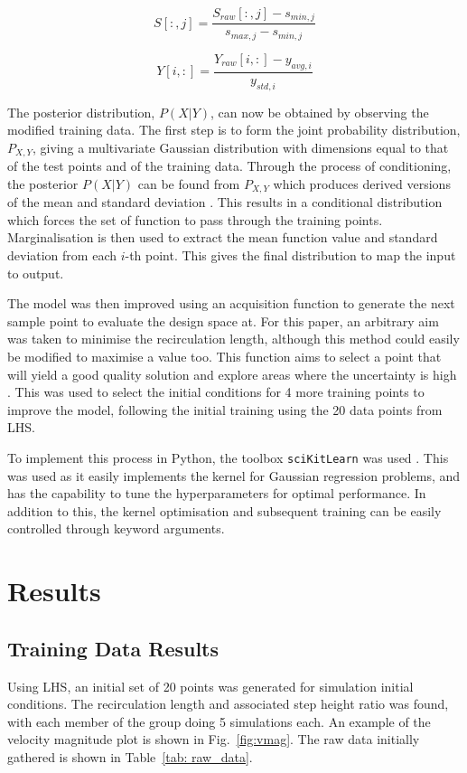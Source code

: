 \documentclass[conference]{IEEEtran}
\begin{document}
\begin{equation}
    S[:,j] = \frac{S_{raw}[:,j]-s_{min,j}}{s_{max,j}-s_{min,j}}
\end{equation}

\begin{equation}
    Y[i,:] = \frac{Y_{raw}[i,:]-y_{avg,i}}{y_{std,i}}
\end{equation}

The posterior distribution, $P(X|Y)$, can now be obtained by observing the modified training data. The first step is to form the joint probability distribution, $P_{X,Y}$, giving a multivariate Gaussian distribution with dimensions equal to that of the test points and of the training data. Through the process of conditioning, the posterior $P(X|Y)$ can be found from $P_{X,Y}$ which produces derived versions of the mean and standard deviation \cite{gortler_visual_2019}. This results in a conditional distribution which forces the set of function to pass through the training points. Marginalisation is then used to extract the mean function value and standard deviation from each $i$-th point. This gives the final distribution to map the input to output.

The model was then improved using an acquisition function to generate the next sample point to evaluate the design space at. For this paper, an arbitrary aim was taken to minimise the recirculation length, although this method could easily be modified to maximise a value too. This function aims to select a point that will yield a good quality solution and explore areas where the uncertainty is high \cite{de_ath_what_2020}. This was used to select the initial conditions for 4 more training points to improve the model, following the initial training using the 20 data points from LHS.

To implement this process in Python, the toolbox \texttt{sciKitLearn} was used \cite{pedregosa_scikit-learn_2011}. This was used as it easily implements the kernel for Gaussian regression problems, and has the capability to tune the hyperparameters for optimal performance. In addition to this, the kernel optimisation and subsequent training can be easily controlled through keyword arguments. 


\section{Results}
\subsection{Training Data Results}
Using LHS, an initial set of 20 points was generated for simulation initial conditions. The recirculation length and associated step height ratio was found, with each member of the group doing 5 simulations each. An example of the velocity magnitude plot is shown in Fig.~\ref{fig:vmag}. The raw data initially gathered is shown in Table~\ref{tab: raw_data}.
\end{document}
